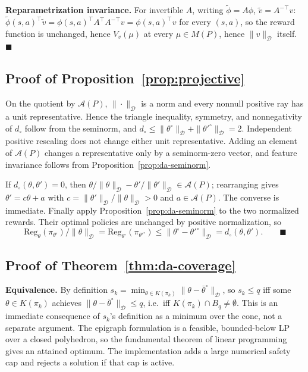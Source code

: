 \documentclass{article}
\newcommand{\Dnorm}[1]{\|#1\|_{\mathcal D}}
\begin{document}
\textbf{Reparametrization invariance.} For invertible $A$, writing
$\tilde\phi=A\phi$, $\tilde v = A^{-\top}v$: $\tilde\phi(s,a)^\top\tilde v =
\phi(s,a)^\top A^\top A^{-\top}v = \phi(s,a)^\top v$ for every $(s,a)$, so the
reward function is unchanged, hence $V_v(\mu)$ at every $\mu\in M(P)$, hence
$\Dnorm{v}$ itself. $\blacksquare$

\subsection{Proof of Proposition~\ref{prop:projective}}

On the quotient by $\mathcal A(P)$, $\Dnorm{\cdot}$ is a norm and every
nonnull positive ray has a unit representative. Hence the triangle inequality,
symmetry, and nonnegativity of $d_\circ$ follow from the seminorm, and
$d_\circ\le\Dnorm{\theta^\circ}+\Dnorm{\theta'^\circ}=2$. Independent positive
rescaling does not change either unit representative. Adding an element of
$\mathcal A(P)$ changes a representative only by a seminorm-zero vector, and
feature invariance follows from Proposition~\ref{prop:da-seminorm}.

If $d_\circ(\theta,\theta')=0$, then
$\theta/\Dnorm{\theta}-\theta'/\Dnorm{\theta'}\in\mathcal A(P)$; rearranging
gives $\theta'=c\theta+a$ with
$c=\Dnorm{\theta'}/\Dnorm{\theta}>0$ and $a\in\mathcal A(P)$. The converse is
immediate. Finally apply Proposition~\ref{prop:da-seminorm} to the two normalized
rewards. Their optimal policies are unchanged by positive normalization, so
\[
 \mathrm{Reg}_{\theta}(\pi_{\theta'})/\Dnorm{\theta}
 =\mathrm{Reg}_{\theta^\circ}(\pi_{\theta'^\circ})
 \le\Dnorm{\theta^\circ-\theta'^\circ}=d_\circ(\theta,\theta').
 \qquad\blacksquare
\]

\subsection{Proof of Theorem~\ref{thm:da-coverage}}
\label{app:proof-da-coverage}

\textbf{Equivalence.} By definition $s_k=\min_{\theta\in K(\pi_k)}
\Dnorm{\theta-\bar\theta^\circ}$, so $s_k\le q$ iff some
$\theta\in K(\pi_k)$ achieves $\Dnorm{\theta-\bar\theta^\circ}\le
q$, i.e.\ iff $K(\pi_k)\cap B_q\ne\emptyset$. This is an
immediate consequence of $s_k$'s definition as a minimum over the cone, not a
separate argument. The epigraph formulation is a feasible, bounded-below LP
over a closed polyhedron, so the fundamental theorem of linear programming
gives an attained optimum. The implementation adds a large numerical safety
cap and rejects a solution if that cap is active.
\end{document}
